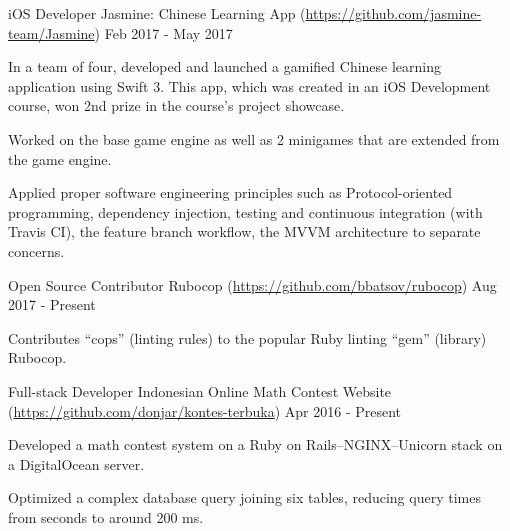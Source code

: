 

\begin{cventries}

  \cventry
  {iOS Developer} %
  {Jasmine: Chinese Learning App (\url{https://github.com/jasmine-team/Jasmine})} %
  {} %
  {Feb 2017 - May 2017} %
  {
    \begin{cvitems} %
    \item {In a team of four, developed and launched a gamified Chinese learning application using Swift 3. This app, which was created in an iOS Development course, won 2nd prize in the course's project showcase.}
    \item {Worked on the base game engine as well as 2 minigames that are extended from the game engine.}
    \item {Applied proper software engineering principles such as Protocol-oriented programming, dependency injection, testing and continuous integration (with Travis CI), the feature branch workflow, the MVVM architecture to separate concerns.}
    \end{cvitems}
  }

  \cventry
  {Open Source Contributor} %
  {Rubocop (\url{https://github.com/bbatsov/rubocop})} %
  {} %
  {Aug 2017 - Present} %
  {
    \begin{cvitems} %
    \item {Contributes ``cops'' (linting rules) to the popular Ruby linting ``gem'' (library) Rubocop.}
    \end{cvitems}
  }

  \cventry
  {Full-stack Developer} %
  {Indonesian Online Math Contest Website (\url{https://github.com/donjar/kontes-terbuka})} %
  {} %
  {Apr 2016 - Present} %
  {
    \begin{cvitems} %
    \item {Developed a math contest system on a Ruby on Rails--NGINX--Unicorn stack on a DigitalOcean server.}
    \item {Optimized a complex database query joining six tables, reducing query times from seconds to around 200 ms.}
    \end{cvitems}
  }

\end{cventries}
